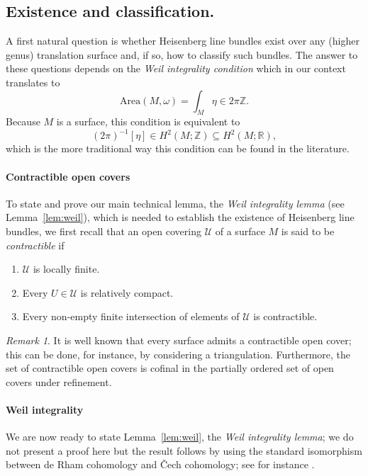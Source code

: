 \documentclass{amsart}
\theoremstyle{definition}
\theoremstyle{remark}
\newtheorem{remark}[theorem]{Remark}
\numberwithin{equation}{section}
\newcommand{\<}{{\langle}}
\renewcommand{\>}{{\rangle}}
\begin{document}
\subsection{Existence and classification.} A first natural question is whether Heisenberg line bundles exist over any (higher genus) translation surface and, if so, how to classify such bundles. The answer to these questions depends on the \textit{Weil integrality condition} which in our context translates to
\[
\mathrm{Area}(M,\omega) = \int_{M} \eta\in 2\pi\mathbb{Z}.
\]
Because $M$ is a surface, this condition is equivalent to
\[
(2\pi)^{-1}[\eta] \in H^2(M;\mathbb{Z}) \subseteq H^2(M;\mathbb{R}),
\]
which is the more traditional way this condition can be found in the literature.\\

\paragraph*{\bf Contractible open covers} To state and prove our main technical lemma, the \textit{Weil integrality lemma} (see Lemma~\ref{lem:weil}), which is needed to establish the existence of Heisenberg line bundles, we first recall that an open covering $\mathcal{U}$ of a surface $M$ is said to be \textit{contractible} if
\begin{enumerate}
    \item $\mathcal{U}$ is locally finite.
    \item Every $U \in \mathcal{U}$ is relatively compact.
    \item Every non-empty finite intersection of elements of $\mathcal{U}$ is contractible.
\end{enumerate}
\begin{remark}\label{rem:opencovers} It is well known that every surface admits a contractible open cover; this can be done, for instance, by considering a triangulation. Furthermore, the set of contractible open covers is cofinal in the partially ordered set of open covers under refinement. 
\end{remark}


\paragraph*{\bf Weil integrality} We are now ready to state Lemma~\ref{lem:weil}, the \textit{Weil integrality lemma}; we do not present a proof here but the result follows by using the standard isomorphism between de Rham cohomology and \v{C}ech cohomology; see for instance \cite[Appendix A.6]{quant}. %
\end{document}
